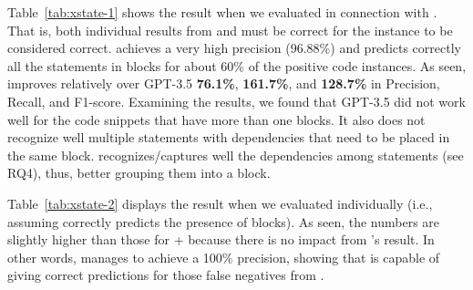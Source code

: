 Table~\ref{tab:xstate-1} shows the result when we evaluated {\xstate}
in connection with {\xblock}. That is, both individual results from
{\xblock} and {\xstate} must be correct for the instance to be
considered correct. {\tool} achieves a very high precision (96.88\%)
and predicts correctly all the statements in  blocks
for about 60\% of the positive code instances. As seen, {\tool}
improves relatively over GPT-3.5 {\bf 76.1\%}, {\bf 161.7\%}, and {\bf
  128.7\%} in Precision, Recall, and F1-score. Examining the results,
we found that GPT-3.5 did not work well for the code snippets that
have more than one  blocks. It also does not recognize
well multiple statements with dependencies that need to be placed in
the same block. {\tool} recognizes/captures well the dependencies among
statements (see RQ4), thus, better grouping them into a
 block.


Table~\ref{tab:xstate-2} displays the result when we evaluated
{\xstate} individually (i.e., assuming {\xblock} correctly predicts
the presence of  blocks). As seen, the numbers are
slightly higher than those for {\xblock}+{\xstate} because there is no
impact from {\xblock}'s result. In other words, {\xstate} manages to
achieve a 100\% precision, showing that {\xstate} is capable of giving
correct predictions for those false negatives from {\xblock}.


%

